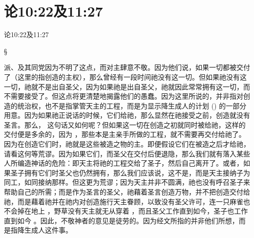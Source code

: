 
\chapter{论10:22及11:27}


论10:22及11:27\par

§ \par

\par

派、及其同党因为不明了这点，而对主肆意不敬。因为他们说，如果一切都被交付了（这里的指创造的主权），那么曾经有一段时间祂没有这一切。但如果祂没有这一切，祂就不是出自圣父，因为如果祂是出自圣父，祂就因此常常拥有这一切，而不需要接受了。但这点将更清楚地揭露他们的愚蠢。因为这里所说的，并非指对创造的统治权，也不是指掌管天主的工程，而是为显示降生成人的计划 () 的一部分用意。因为如果祂正说话的时候，它们给祂，那么显然在祂接受之前，创造就没有圣言。那么，  这句话又如何呢？但如果这一切在创造之初就同时被给祂，这样的交付便是多余的，因为 ，那些本是主亲手所做的工程，就不需要再交付给祂了。因为在创造它们时，祂就是这些被造之物的主。即便假设它们在被造之后才给祂，请看这何等荒谬。因为如果它们，而圣父在交付后便退隐，那么我们就有落入某些人所编造神话的危险：即天主将祂的工程交给了圣子，然后自己离开了。或者，如果圣子拥有它们时圣父也仍然拥有，那么我们应该说，这不是，而是天主接纳子为同工，如同接纳那样。但这更为荒谬；因为天主并非不圆满，祂也没有呼召圣子来帮助自己的所需；而是作为圣言的圣父，祂藉着圣言创造万物，并不把创造交付给祂，而是藉着祂并在祂内对创造施行天主眷顾，以致没有圣父许可，连一只麻雀也不会掉在地上 ，野草没有天主就无从穿着 ，而且圣父工作直到如今，圣子也工作直到如今 。因此，不敬神者的意见是徒劳的。因为经文所指的并非他们所想，而是指降生成人这件事。\par


